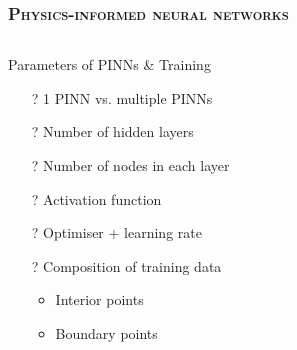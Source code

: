 \documentclass[aspectratio=1610, 10pt]{beamer}
\begin{document}
\begin{frame}
    \frametitle{\textsc{Physics-informed neural networks}}

    \begin{columns}
    \begin{column}{0.48\textwidth}
    
    \begin{blueblockshadow}{Parameters of PINNs \& Training}
    \vspace{0.2cm}
    \begin{itemize}
        \item[{\fontfamily{cyklop}\selectfont \footnotesize{?}}] 1 PINN vs. multiple PINNs
        \item[{\fontfamily{cyklop}\selectfont \footnotesize{?}}] Number of hidden layers
        \item[{\fontfamily{cyklop}\selectfont \footnotesize{?}}] Number of nodes in each layer
        \item[{\fontfamily{cyklop}\selectfont \footnotesize{?}}] Activation function
        \item[{\fontfamily{cyklop}\selectfont \footnotesize{?}}] Optimiser + learning rate
        \item[{\fontfamily{cyklop}\selectfont \footnotesize{?}}] Composition of training data 
        \begin{itemize}
            \item Interior points
            \item Boundary points
        \end{itemize}
    \end{itemize}
    \end{blueblockshadow}
    \end{column}
    \begin{column}{0.48\textwidth}
    

\end{column}
\end{columns}
\end{frame}
\end{document}
